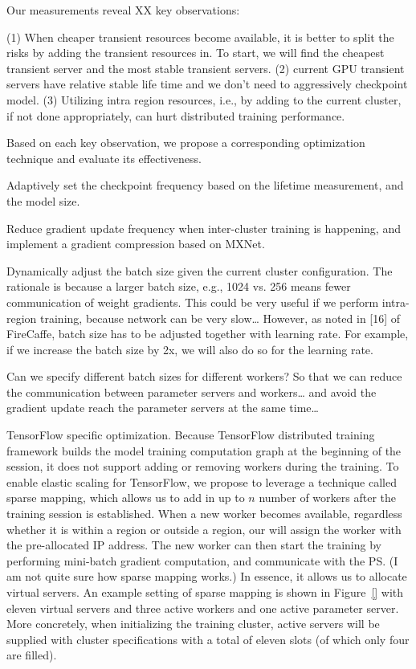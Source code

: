 Our measurements reveal XX key observations: 

(1)	When cheaper transient resources become available, it is better to split the risks by adding the transient resources in. To start, we will find the cheapest transient server and the most stable transient servers. 
(2)	current GPU transient servers have relative stable life time and we don’t need to aggressively checkpoint model. 
(3)	Utilizing intra region resources, i.e., by adding to the current cluster, if not done appropriately, can hurt distributed training performance. 

Based on each key observation, we propose a corresponding optimization technique and evaluate its effectiveness. 

Adaptively set the checkpoint frequency based on the lifetime measurement, and the model size. 

Reduce gradient update frequency when inter-cluster training is happening, and implement a gradient compression based on MXNet. 


Dynamically adjust the batch size given the current cluster configuration. The rationale is because a larger batch size, e.g., 1024 vs. 256 means fewer communication of weight gradients. This could be very useful if we perform intra-region training, because network can be very slow… However, as noted in [16] of FireCaffe, batch size has to be adjusted together with learning rate. For example, if we increase the batch size by 2x, we will also do so for the learning rate. 

Can we specify different batch sizes for different workers? So that we can reduce the communication between parameter servers and workers… and avoid the gradient update reach the parameter servers at the same time…


TensorFlow specific optimization. Because TensorFlow distributed training framework builds the model training computation graph at the beginning of the session, it does not support adding or removing workers during the training. To enable elastic scaling for TensorFlow, we propose to leverage a technique called sparse mapping, which allows us to add in up to $n$ number of workers after the training session is established. When a new worker becomes available, regardless whether it is within a region or outside a region, our \sysname will assign the worker with the pre-allocated IP address. The new worker can then start the training by performing mini-batch gradient computation, and communicate with the PS. (I am not quite sure how sparse mapping works.) In essence, it allows us to allocate virtual servers. An example setting of sparse mapping is shown in Figure~\ref{} with eleven virtual servers and three active workers and one active parameter server. More concretely, when initializing the training cluster, active servers will be supplied with cluster specifications with a total of eleven slots (of which only four are filled). 

